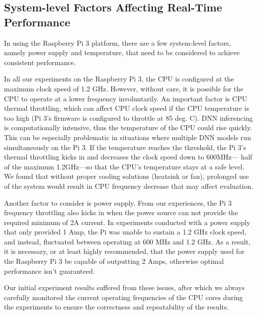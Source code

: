
\subsection{System-level Factors Affecting Real-Time Performance}
In using the Raspberry Pi 3 platform, there are a
few system-level factors, namely power supply and temperature, that
need to be considered to achieve consistent performance. 

In all our experiments on the Raspberry Pi 3, the CPU  is configured
at the maximum clock speed of 1.2 GHz. However, without care, it is
possible for the CPU to operate at a lower frequency involuntarily. 
An important factor is CPU thermal throttling, which can affect CPU
clock speed if the CPU temperature is too high (Pi 3's firmware is
configured to throttle at 85 deg. C).
DNN inferencing is computationally intensive, thus the temperature of
the CPU could rise quickly. This can be especially problematic in
situations where multiple DNN models run simultaneously on the
Pi 3. If the temperature reaches the threshold, the Pi 3's thermal
throttling kicks in and decreases the clock speed down to 600MHz---
half of the maximum 1.2GHz---so that the CPU's temperature stays at a
safe level.
We found that without proper cooling solutions (heatsink or fan), 
prolonged use of the system would result in CPU frequency decrease
that may affect evaluation.

Another factor to consider is power supply. From our experiences, the
Pi 3 frequency throttling also kicks in when the power source can not
provide the required minimum of 2A current.
In experiments conducted with a power supply that only provided 1 Amp,
the Pi was unable to sustain a 1.2 GHz clock speed, and instead,
fluctuated between operating at 600 MHz and 1.2 GHz. As a result, it
is necessary, or at least highly recommended, that the power supply
used for the Raspberry Pi 3 be capable of outputting 2 Amps, otherwise
optimal performance isn't guaranteed.

Our initial experiment results suffered from these issues, after which
we always carefully monitored the current operating frequencies of the
CPU cores during the experiments to ensure the correctness and
repeatability of the results.
